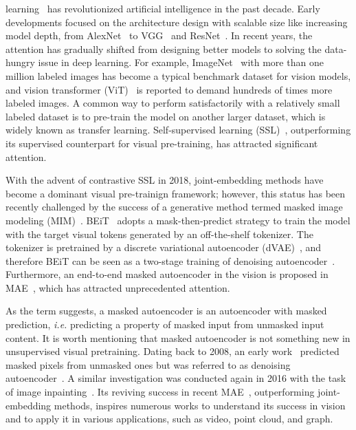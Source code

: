\documentclass[10pt,journal,compsoc]{IEEEtran}
\begin{document}
 learning~\cite{lecun2015deep} has revolutionized artificial intelligence in the past decade. Early developments focused on the architecture design with scalable size like increasing model depth, from AlexNet~\cite{krizhevsky2012imagenet} to VGG~\cite{simonyan2014very} and ResNet~\cite{he2016deep}. In recent years, the attention has gradually shifted from designing better models to solving the data-hungry issue in deep learning. For example, ImageNet~\cite{deng2009imagenet} with more than one million labeled images has become a typical benchmark dataset for vision models, and vision transformer (ViT)~\cite{dosovitskiy2021an} is reported to demand hundreds of times more labeled images. A common way to perform satisfactorily with a relatively small labeled dataset is to pre-train the model on another larger dataset, which is widely known as transfer learning. Self-supervised learning (SSL)~\cite{he2020momentum,chen2020simple}, outperforming its supervised counterpart for visual pre-training, has attracted significant attention. %



With the advent of contrastive SSL in 2018, joint-embedding methods have become a dominant visual pre-trainign framework; however, this status has been recently challenged by the success of a generative method termed masked image modeling (MIM)~\cite{bao2022beit}. BEiT~\cite{bao2022beit} adopts a mask-then-predict strategy to train the model with the target visual tokens generated by an off-the-shelf tokenizer. The tokenizer is pretrained by a discrete variational autoencoder (dVAE)~\cite{ramesh2021zero}, and therefore BEiT can be seen as a two-stage training of denoising autoencoder~\cite{vincent2008extracting}. Furthermore, an end-to-end masked autoencoder in the vision is proposed in MAE~\cite{he2022masked}, which has attracted unprecedented attention. 



As the term suggests, a masked autoencoder is an autoencoder with masked prediction, \textit{i.e.} predicting a property of masked input from unmasked input content. It is worth mentioning that masked autoencoder is not something new in unsupervised visual pretraining. Dating back to 2008, an early work~\cite{vincent2008extracting} predicted masked pixels from unmasked ones but was referred to as denoising autoencoder~\cite{vincent2008extracting,vincent2010stacked}. A similar investigation was conducted again in 2016 with the task of image inpainting~\cite{pathak2016context}. Its reviving success in recent MAE~\cite{he2022masked}, outperforming joint-embedding methods, inspires numerous works to understand its success in vision and to apply it in various applications, such as video, point cloud, and graph. 
\end{document}
